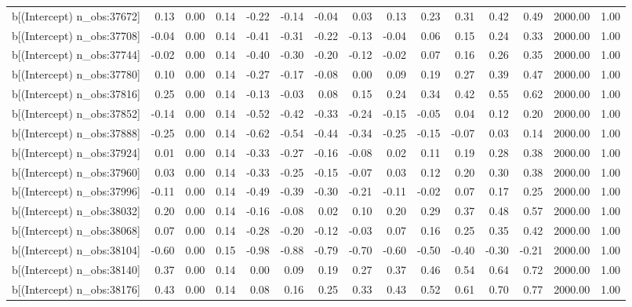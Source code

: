 \begin{table}[ht]
\begin{tabular}{rrrrrrrrrrrrrrr}
  b[(Intercept) n\_obs:37672] & 0.13 & 0.00 & 0.14 & -0.22 & -0.14 & -0.04 & 0.03 & 0.13 & 0.23 & 0.31 & 0.42 & 0.49 & 2000.00 & 1.00 \\ 
  b[(Intercept) n\_obs:37708] & -0.04 & 0.00 & 0.14 & -0.41 & -0.31 & -0.22 & -0.13 & -0.04 & 0.06 & 0.15 & 0.24 & 0.33 & 2000.00 & 1.00 \\ 
  b[(Intercept) n\_obs:37744] & -0.02 & 0.00 & 0.14 & -0.40 & -0.30 & -0.20 & -0.12 & -0.02 & 0.07 & 0.16 & 0.26 & 0.35 & 2000.00 & 1.00 \\ 
  b[(Intercept) n\_obs:37780] & 0.10 & 0.00 & 0.14 & -0.27 & -0.17 & -0.08 & 0.00 & 0.09 & 0.19 & 0.27 & 0.39 & 0.47 & 2000.00 & 1.00 \\ 
  b[(Intercept) n\_obs:37816] & 0.25 & 0.00 & 0.14 & -0.13 & -0.03 & 0.08 & 0.15 & 0.24 & 0.34 & 0.42 & 0.55 & 0.62 & 2000.00 & 1.00 \\ 
  b[(Intercept) n\_obs:37852] & -0.14 & 0.00 & 0.14 & -0.52 & -0.42 & -0.33 & -0.24 & -0.15 & -0.05 & 0.04 & 0.12 & 0.20 & 2000.00 & 1.00 \\ 
  b[(Intercept) n\_obs:37888] & -0.25 & 0.00 & 0.14 & -0.62 & -0.54 & -0.44 & -0.34 & -0.25 & -0.15 & -0.07 & 0.03 & 0.14 & 2000.00 & 1.00 \\ 
  b[(Intercept) n\_obs:37924] & 0.01 & 0.00 & 0.14 & -0.33 & -0.27 & -0.16 & -0.08 & 0.02 & 0.11 & 0.19 & 0.28 & 0.38 & 2000.00 & 1.00 \\ 
  b[(Intercept) n\_obs:37960] & 0.03 & 0.00 & 0.14 & -0.33 & -0.25 & -0.15 & -0.07 & 0.03 & 0.12 & 0.20 & 0.30 & 0.38 & 2000.00 & 1.00 \\ 
  b[(Intercept) n\_obs:37996] & -0.11 & 0.00 & 0.14 & -0.49 & -0.39 & -0.30 & -0.21 & -0.11 & -0.02 & 0.07 & 0.17 & 0.25 & 2000.00 & 1.00 \\ 
  b[(Intercept) n\_obs:38032] & 0.20 & 0.00 & 0.14 & -0.16 & -0.08 & 0.02 & 0.10 & 0.20 & 0.29 & 0.37 & 0.48 & 0.57 & 2000.00 & 1.00 \\ 
  b[(Intercept) n\_obs:38068] & 0.07 & 0.00 & 0.14 & -0.28 & -0.20 & -0.12 & -0.03 & 0.07 & 0.16 & 0.25 & 0.35 & 0.42 & 2000.00 & 1.00 \\ 
  b[(Intercept) n\_obs:38104] & -0.60 & 0.00 & 0.15 & -0.98 & -0.88 & -0.79 & -0.70 & -0.60 & -0.50 & -0.40 & -0.30 & -0.21 & 2000.00 & 1.00 \\ 
  b[(Intercept) n\_obs:38140] & 0.37 & 0.00 & 0.14 & 0.00 & 0.09 & 0.19 & 0.27 & 0.37 & 0.46 & 0.54 & 0.64 & 0.72 & 2000.00 & 1.00 \\ 
  b[(Intercept) n\_obs:38176] & 0.43 & 0.00 & 0.14 & 0.08 & 0.16 & 0.25 & 0.33 & 0.43 & 0.52 & 0.61 & 0.70 & 0.77 & 2000.00 & 1.00 \\ 

\end{tabular}
\end{table}
